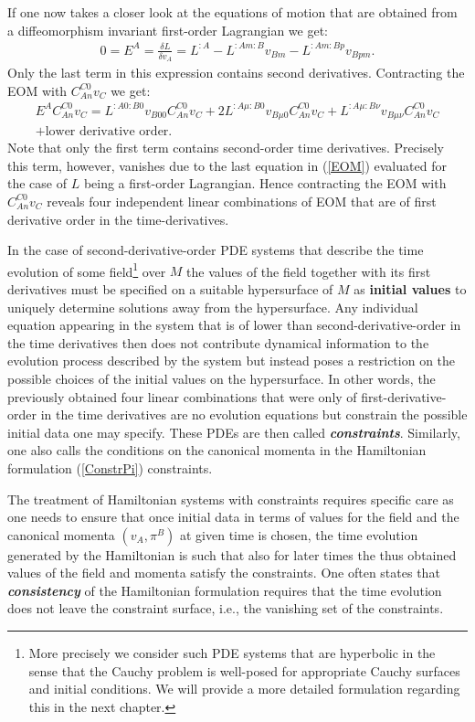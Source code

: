 If one now takes a closer look at the equations of motion that are obtained from a diffeomorphism invariant first-order Lagrangian we get:
\begin{align}
    0 = E^A = \frac{\delta L}{\delta v_A} = L^{:A} - L^{:Am:B} v_{Bm} - L^{:Am:Bp}v_{Bpm}.
\end{align}
Only the last term in this expression contains second derivatives.
Contracting the EOM with $C_{An}^{C0}v_C$ we get:
\begin{multline}
    E^A C_{An}^{C0}v_C = L^{:A0:B0}v_{B00}C_{An}^{C0}v_C + 2L^{:A\mu : B 0} v_{B\mu 0}C_{An}^{C0}v_C + L^{:A\mu : B \nu} v_{B\mu \nu}C_{An}^{C0}v_C\\
    + \text{lower derivative order}.
\end{multline}
Note that only the first term contains second-order time derivatives. Precisely this term, however, vanishes due to the last equation in (\ref{EOM}) evaluated for the case of $L$ being a first-order Lagrangian. Hence contracting the EOM with $C_{An}^{C0}v_C$ reveals four independent linear combinations of EOM that are of first derivative order in the time-derivatives.

In the case of second-derivative-order PDE systems that describe the time evolution of some field\footnote{More precisely we consider such PDE systems that are hyperbolic in the sense that the Cauchy problem is well-posed for appropriate Cauchy surfaces and initial conditions. We will provide a more detailed formulation regarding this in the next chapter.} over $M$ the values of the field together with its first derivatives must be specified on a suitable hypersurface of $M$ as \textbf{\textbf{initial values}} to uniquely determine solutions away from the hypersurface. 
Any individual equation appearing in the system that is of lower than second-derivative-order in the time derivatives then does not contribute dynamical information to the evolution process described by the system but instead poses a restriction on the possible choices of the initial values on the hypersurface. In other words, the previously obtained four linear combinations that were only of first-derivative-order in the time derivatives are no evolution equations but constrain the possible initial data one may specify. These PDEs are then called \textbf{\textit{constraints}}.
Similarly, one also calls the conditions on the canonical momenta in the Hamiltonian formulation (\ref{ConstrPi}) constraints.

The treatment of Hamiltonian systems with constraints requires specific care as one needs to ensure that once initial data in terms of values for the field and the canonical momenta $(v_A,\pi^B)$ at given time is chosen, the time evolution generated by the Hamiltonian is such that also for later times the thus obtained values of the field and momenta satisfy the constraints. One often states that \textbf{\textit{consistency}} of the Hamiltonian formulation requires that the time evolution does not leave the constraint surface, i.e., the vanishing set of the constraints.

